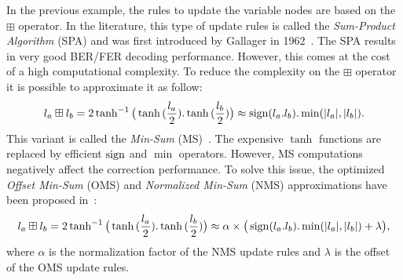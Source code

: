 In the previous example, the rules to update the variable nodes are based on the
$\boxplus$ operator. In the literature, this type of update rules is called the
\emph{Sum-Product Algorithm} (SPA) and was first introduced by Gallager in
1962~\cite{Gallager1962}. The SPA results in very good BER/FER decoding
performance. However, this comes at the cost of a high computational complexity.
To reduce the complexity on the $\boxplus$ operator it is possible to
approximate it as follow:
\begin{equation}
\label{eq:ctx_ldpc_ms}
l_a \boxplus l_b = 2\tanh^{-1}{\big(\tanh{(\frac{l_a}{2}).\tanh{(\frac{l_b}{2})}}\big)} \approx \operatorname*{sign}(l_a.l_b).\min(|l_a|, |l_b|).
\end{equation}
This variant is called the \emph{Min-Sum} (MS)~\cite{Fossorier1999}.
The expensive $\tanh$ functions are replaced by efficient $\operatorname*{sign}$ and $\min$
operators. However, MS computations negatively affect the correction
performance. To solve this issue, the optimized \emph{Offset Min-Sum} (OMS) and
\emph{Normalized Min-Sum} (NMS) approximations have been proposed
in~\cite{Chen2002}:
\begin{equation}
\label{eq:ctx_ldpc_onms}
l_a \boxplus l_b = 2\tanh^{-1}{\big(\tanh{(\frac{l_a}{2}).\tanh{(\frac{l_b}{2})}}\big)} \approx \alpha \times \big( \operatorname*{sign}(l_a.l_b).\min(|l_a|, |l_b|) + \lambda \big),
\end{equation}
where $\alpha$ is the normalization factor of the NMS update rules and $\lambda$
is the offset of the OMS update rules.



